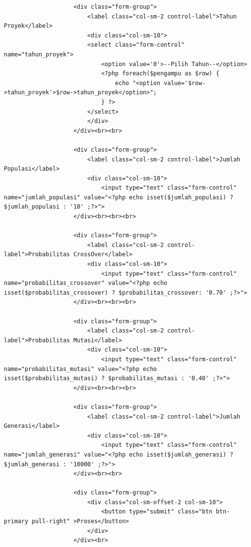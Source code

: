 \begin{enumerate}
\begin{lstlisting}
                    <div class="form-group">
                        <label class="col-sm-2 control-label">Tahun Proyek</label>
                        <div class="col-sm-10"> 
                        <select class="form-control" name="tahun_proyek">
                            <option value='0'>--Pilih Tahun--</option>
                            <?php foreach($pengampu as $row) {
                                echo "<option value='$row->tahun_proyek'>$row->tahun_proyek</option>";
                            } ?>
                        </select>
                        </div>
                    </div><br><br>  
                    
                    <div class="form-group">
                        <label class="col-sm-2 control-label">Jumlah Populasi</label>
                        <div class="col-sm-10">
                            <input type="text" class="form-control" name="jumlah_populasi" value="<?php echo isset($jumlah_populasi) ? $jumlah_populasi : '10' ;?>">  
                    </div><br><br><br>   
                    
                    <div class="form-group">
                        <label class="col-sm-2 control-label">Probabilitas CrossOver</label>
                        <div class="col-sm-10">
                            <input type="text" class="form-control" name="probabilitas_crossover" value="<?php echo isset($probabilitas_crossover) ? $probabilitas_crossover: '0.70' ;?>">  
                    </div><br><br><br>  

                    <div class="form-group">
                        <label class="col-sm-2 control-label">Probabilitas Mutasi</label>
                        <div class="col-sm-10">
                            <input type="text" class="form-control" name="probabilitas_mutasi" value="<?php echo isset($probabilitas_mutasi) ? $probabilitas_mutasi : '0.40' ;?>"> 
                    </div><br><br><br>
                    
                    <div class="form-group">
                        <label class="col-sm-2 control-label">Jumlah Generasi</label>
                        <div class="col-sm-10">
                            <input type="text" class="form-control" name="jumlah_generasi" value="<?php echo isset($jumlah_generasi) ? $jumlah_generasi : '10000' ;?>">  
                    </div><br><br>
            
                    <div class="form-group">
                        <div class="col-sm-offset-2 col-sm-10">
                            <button type="submit" class="btn btn-primary pull-right" >Proses</button>
                        </div>
                    </div><br>
                

\end{lstlisting}
\end{enumerate}

